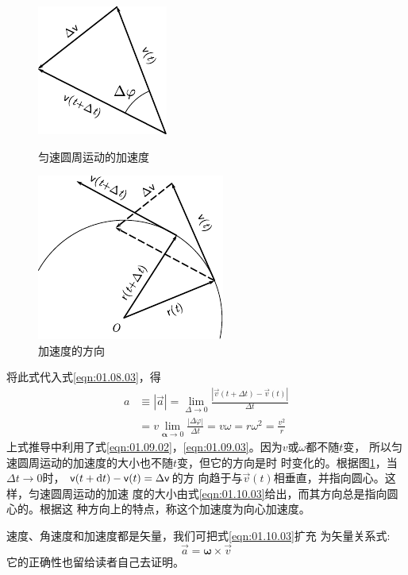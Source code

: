 \begin{figure}[!h]
    \small\centering
    \begin{minipage}[b]{14em}
        \includegraphics{figure/fig01.22}
        \vspace{1em}
        \caption{匀速圆周运动的加速度}
        \label{fig:01.22}
    \end{minipage}
    \begin{minipage}[b]{14em}
        \centering
        \includegraphics{figure/fig01.23}
        \caption{加速度的方向}
        \label{fig:01.23}
    \end{minipage}
\end{figure}
\noindent 将此式代入式\eqref{eqn:01.08.03}，得
\begin{equation}\label{eqn:01.10.03}
    \begin{aligned}
        a & \equiv|\vec{a}|=\lim _{\Delta \rightarrow 0} \frac{|\vec{v}(t+\Delta t)-\vec{v}(t)|}{\Delta t} \\
        &=v\lim_{\boldsymbol{\alpha} \rightarrow 0} \frac{|\Delta \varphi|}{\Delta t}=v \omega=r \omega^{2}=\frac{v^{2}}{r}
    \end{aligned}
\end{equation}\vspace{0.5em}
上式推导中利用了式\eqref{eqn:01.09.02}，\eqref{eqn:01.09.03}。因为$v$或$\omega$都不随$t$变，
所以匀速圆周运动的加速度的大小也不随$t$变，但它的方向是时
时变化的。根据图\ref{fig:01.23}，当$\Delta t\rightarrow 0$时，
${\mathsf{v}}(t+{\mathrm d} t)-{\mathsf{v}}(t)=\Delta{\mathsf{v}}$的方
向趋于与$\vec{v}(t)$相垂直，并指向圆心。这样，匀速圆周运动的加速
度的大小由式\eqref{eqn:01.10.03}给出，而其方向总是指向圆心的。根据这
种方向上的特点，称这个加速度为向心加速度。

速度、角速度和加速度都是矢量，我们可把式\eqref{eqn:01.10.03}扩充
为矢量关系式:
\clearpage
~\vspace{-1.56em}
\begin{equation}\label{eqn:01.10.04}
    \vec{a}=\pmb{\omega}\times \vec{v}
\end{equation}
它的正确性也留给读者自己去证明。